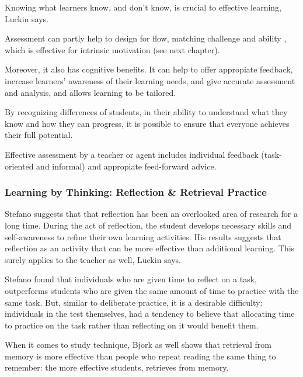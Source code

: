   Knowing what learners know, and don't know, is crucial to effective learning, Luckin \citep{luckin} says.

  Assessment can partly help to design for flow, matching challenge and ability \citep{bruhlmann}, which is effective for intrinsic motivation (see next chapter).

  Moreover, it also has cognitive benefits. It can help to offer appropiate feedback, increase learners' awareness of their learning needs, and give accurate assessment and analysis, and allows learning to be tailored.

  By recognizing differences of students, in their ability to understand what they know and how they can progress, it is possible to ensure that everyone achieves their full potential.

  Effective assessment by a teacher or agent includes individual feedback (task-oriented and informal) and appropiate feed-forward advice.

  \subsubsection{Learning by Thinking: Reflection \& Retrieval Practice}

  Stefano \citep{stefano} suggests that that reflection has been an overlooked area of research for a long time. During the act of reflection, the student develops necessary skills and self-awareness to refine their own learning activities. His results suggests that reflection as an activity that can be more effective than additional learning. This surely applies to the teacher as well, Luckin says. \citep{luckin}

  Stefano found that individuals who are given time to reflect on a task, outperforms students who are given the same amount of time to practice with the same task. But, similar to deliberate practice, it is a desirable difficulty: individuals in the test themselves, had a tendency to believe that allocating time to practice on the task rather than reflecting on it would benefit them.


  When it comes to study technique, Bjork \citep{bjork} as well shows that retrieval from memory is more effective than people who repeat reading the same thing to remember: the more effective students, retrieves from memory.

